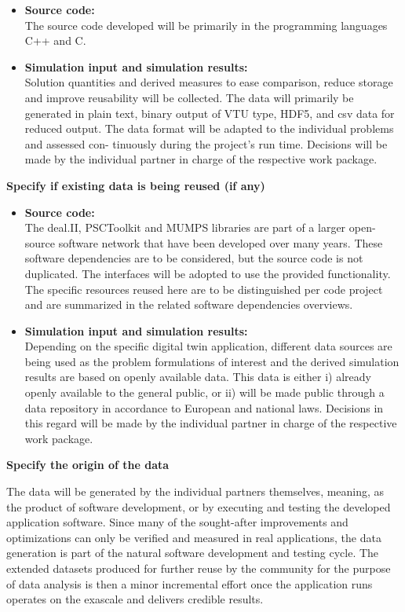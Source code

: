 \documentclass[a4paper,12pt]{article}
\begin{document}
\begin{itemize}
    \item  \textbf{Source code:}\\
        The source code developed will be primarily in the programming languages C++ and C.  
    \item  \textbf{Simulation input and simulation results:}\\
        Solution quantities and derived measures to ease comparison, reduce storage and improve reusability will be collected. The data will primarily be generated in
        plain text, binary output of VTU type, HDF5, and csv data for reduced output.
        The data format will be adapted to the individual problems and assessed con-
        tinuously during the project’s run time. Decisions will be made by the individual
        partner in charge of the respective work package.
\end{itemize}

\noindent \textbf{Specify if existing data is being reused (if any)}

\begin{itemize}
    \item  \textbf{Source code:}\\
        The deal.II, PSCToolkit and MUMPS libraries are part of a larger open-source software network that have been developed over many years. These software dependencies are to be considered, but the source code is not duplicated. The interfaces will be adopted to use the provided functionality. The specific resources reused here are to be distinguished per code project and are summarized in the related software dependencies overviews.  
    \item  \textbf{Simulation input and simulation results:}\\
        Depending on the specific digital twin application, different data sources are being used as the problem formulations of interest and the derived simulation results are based on openly available data. This data is either i) already openly available to the general public, or ii) will be made public through a data repository in accordance to European and national laws. Decisions in this regard will be made by the individual partner in charge of the respective work package.
\end{itemize}

\noindent \textbf{Specify the origin of the data}

The data will be generated by the individual partners themselves, meaning, as the product of software development, or by executing and testing the developed application software. Since many of the sought-after improvements and optimizations can only be verified and measured in real applications, the data generation is part of the natural software development and testing cycle. The extended datasets produced for further reuse by the community for the purpose of data analysis is then a minor incremental effort once the application runs operates on the exascale and delivers credible results.
\end{document}
